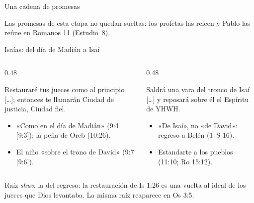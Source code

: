 \begin{frame}{Una cadena de promesas}
\elabpropia
\vspace{2pt}
\begin{clave}
Las promesas de esta etapa no quedan sueltas: los profetas las releen y Pablo las reúne en Romanos 11 (Estudio~8).
\end{clave}
\end{frame}

\begin{frame}{Isaías: del día de Madián a Isaí}
\begin{columns}[T,onlytextwidth]
\begin{column}{0.48\textwidth}
\par\smallskip
\begin{cita}Restauraré tus jueces como al principio [\ldots]; entonces te llamarán Ciudad de justicia, Ciudad fiel.\end{cita}
\footnotesize
\begin{itemize}
\item «Como en el día de Madián» (9:4 [9:3]); la peña de Oreb (10:26).
\item El niño «sobre el trono de David» (9:7 [9:6]).
\end{itemize}
\end{column}
\begin{column}{0.48\textwidth}
\par\smallskip
\begin{cita}Saldrá una vara del tronco de Isaí [\ldots] y reposará sobre él el Espíritu de YHWH.\end{cita}
\footnotesize
\begin{itemize}
\item «De Isaí», no «de David»: regreso a Belén (1~S 16).
\item Estandarte a los pueblos (11:10; Ro 15:12).
\end{itemize}
\end{column}
\end{columns}
\vspace{4pt}
\begin{notalam}
Raíz \emph{shuv}, la del regreso: la restauración de Is 1:26 es una vuelta al ideal de los jueces que Dios levantaba. La misma raíz reaparece en Os 3:5.
\end{notalam}
\end{frame}

